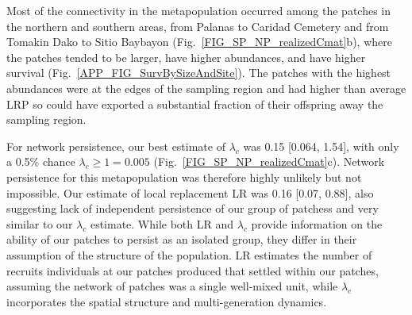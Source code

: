 \documentclass[12pt, oneside]{article}   	%
\begin{document}

Most of the connectivity in the metapopulation occurred among the patches in the northern and southern areas, from Palanas to Caridad Cemetery and from Tomakin Dako to Sitio Baybayon (Fig.\ \ref{FIG_SP_NP_realizedCmat}b), where the patches tended to be larger, have higher abundances, and have higher survival (Fig.\ \ref{APP_FIG_SurvBySizeAndSite}). The patches with the highest abundances were at the edges of the sampling region and had higher than average LRP so could have exported a substantial fraction of their offspring away the sampling region. %

For network persistence, our best estimate of $\lambda_{c}$ was 0.15 [0.064, 1.54], with only a 0.5\% chance $\lambda_{c} \geq 1 = 0.005$ (Fig.\ \ref{FIG_SP_NP_realizedCmat}c). Network persistence for this metapopulation was therefore highly unlikely but not impossible. Our estimate of local replacement LR was 0.16 [0.07, 0.88], also suggesting lack of independent persistence of our group of patchess and very similar to our $\lambda_{c}$ estimate. While both LR and $\lambda_{c}$ provide information on the ability of our patches to persist as an isolated group, they differ in their assumption of the structure of the population. LR estimates the number of recruits individuals at our patches produced that settled within our patches, assuming the network of patches was a single well-mixed unit, while $\lambda_{c}$ incorporates the spatial structure and multi-generation dynamics. %
\end{document}
